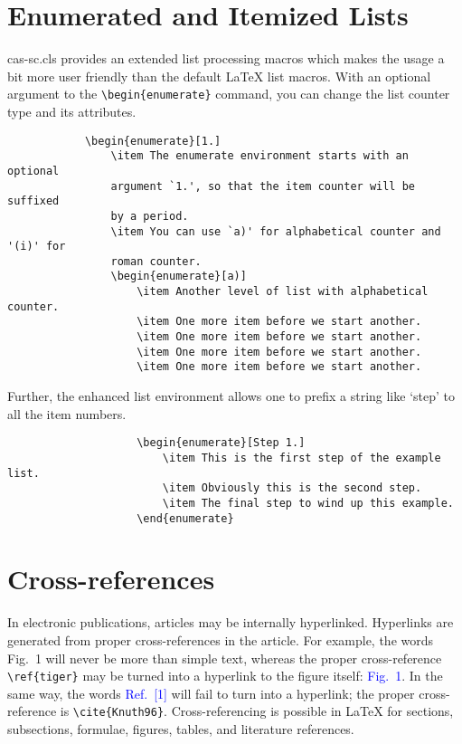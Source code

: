 \documentclass[a4paper,fleqn]{cas-sc}
\begin{document}
	
	\section[Enumerated ...]{Enumerated and Itemized Lists}
	{cas-sc.cls} provides an extended list processing macros
	which makes the usage a bit more user friendly than the default
	\LaTeX{} list macros.   With an optional argument to the
	\verb+\begin{enumerate}+ command, you can change the list counter
		type and its attributes.
		
		\begin{verbatim}
			\begin{enumerate}[1.]
				\item The enumerate environment starts with an optional
				argument `1.', so that the item counter will be suffixed
				by a period.
				\item You can use `a)' for alphabetical counter and '(i)' for
				roman counter.
				\begin{enumerate}[a)]
					\item Another level of list with alphabetical counter.
					\item One more item before we start another.
					\item One more item before we start another.
					\item One more item before we start another.
					\item One more item before we start another.
				\end{verbatim}
				
				Further, the enhanced list environment allows one to prefix a
				string like `step' to all the item numbers.  
				
				\begin{verbatim}
					\begin{enumerate}[Step 1.]
						\item This is the first step of the example list.
						\item Obviously this is the second step.
						\item The final step to wind up this example.
					\end{enumerate}
				\end{verbatim}
				
				\section{Cross-references}
				In electronic publications, articles may be internally
				hyperlinked. Hyperlinks are generated from proper
				cross-references in the article.  For example, the words
				\textcolor{black!80}{Fig.~1} will never be more than simple text,
				whereas the proper cross-reference \verb+\ref{tiger}+ may be
				turned into a hyperlink to the figure itself:
				\textcolor{blue}{Fig.~1}.  In the same way,
				the words \textcolor{blue}{Ref.~[1]} will fail to turn into a
				hyperlink; the proper cross-reference is \verb+\cite{Knuth96}+.
				Cross-referencing is possible in \LaTeX{} for sections,
				subsections, formulae, figures, tables, and literature
				references.
				
\end{document}
